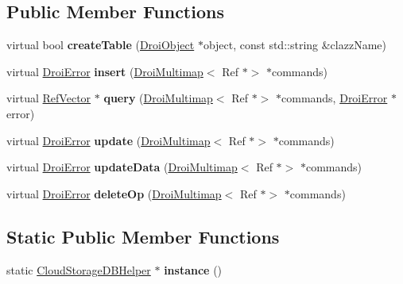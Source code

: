 \subsection*{Public Member Functions}
\begin{DoxyCompactItemize}
\item 
\mbox{\label{class_cloud_storage_d_b_helper_a7e0af87625dacc3638a48d02ec01bcfb}} 
virtual bool {\bfseries create\+Table} (\hyperlink{class_droi_object}{Droi\+Object} $\ast$object, const std\+::string \&clazz\+Name)
\item 
\mbox{\label{class_cloud_storage_d_b_helper_a87976eb58931745fba7a70408efb785e}} 
virtual \hyperlink{class_droi_error}{Droi\+Error} {\bfseries insert} (\hyperlink{class_droi_multimap}{Droi\+Multimap}$<$ Ref $\ast$$>$ $\ast$commands)
\item 
\mbox{\label{class_cloud_storage_d_b_helper_a91e6175f5e9908c83453662fed6d2b7e}} 
virtual \hyperlink{class_ref_vector}{Ref\+Vector} $\ast$ {\bfseries query} (\hyperlink{class_droi_multimap}{Droi\+Multimap}$<$ Ref $\ast$$>$ $\ast$commands, \hyperlink{class_droi_error}{Droi\+Error} $\ast$error)
\item 
\mbox{\label{class_cloud_storage_d_b_helper_a9f84dae9846ecdafa346aa872efa5226}} 
virtual \hyperlink{class_droi_error}{Droi\+Error} {\bfseries update} (\hyperlink{class_droi_multimap}{Droi\+Multimap}$<$ Ref $\ast$$>$ $\ast$commands)
\item 
\mbox{\label{class_cloud_storage_d_b_helper_a50a19d3dacc985b02b6d01f22cffd4d9}} 
virtual \hyperlink{class_droi_error}{Droi\+Error} {\bfseries update\+Data} (\hyperlink{class_droi_multimap}{Droi\+Multimap}$<$ Ref $\ast$$>$ $\ast$commands)
\item 
\mbox{\label{class_cloud_storage_d_b_helper_a7408d0f54f2622ec06cdd68ef1541e6f}} 
virtual \hyperlink{class_droi_error}{Droi\+Error} {\bfseries delete\+Op} (\hyperlink{class_droi_multimap}{Droi\+Multimap}$<$ Ref $\ast$$>$ $\ast$commands)
\end{DoxyCompactItemize}
\subsection*{Static Public Member Functions}
\begin{DoxyCompactItemize}
\item 
\mbox{\label{class_cloud_storage_d_b_helper_ad53635f8131c61074b7ce9fecfe1ade2}} 
static \hyperlink{class_cloud_storage_d_b_helper}{Cloud\+Storage\+D\+B\+Helper} $\ast$ {\bfseries instance} ()
\end{DoxyCompactItemize}
